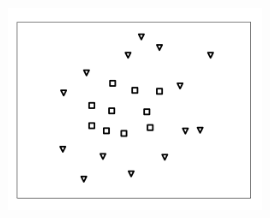 \documentclass[a4paper,11pt,oneside]{book}
\begin{document}
\begin{enumerate}
        \begin{figure}[H]
            \centering
            \includegraphics[width=0.6\textwidth,height=0.4\textheight,keepaspectratio]{images/3_26_Jun_2018.png}
        \end{figure}
    \end{enumerate}

\clearpage
\end{document}
